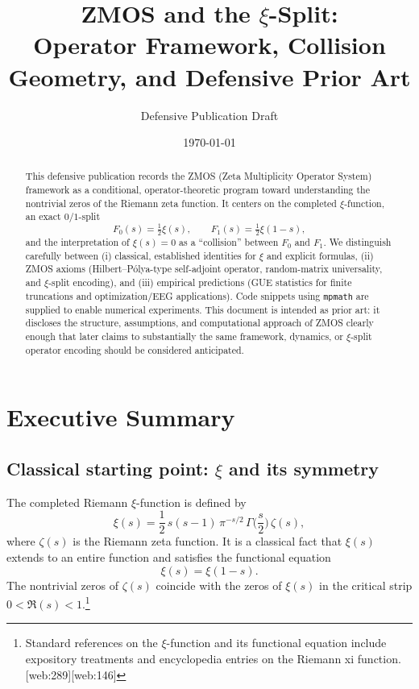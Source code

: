 \documentclass[11pt]{article}
\title{ZMOS and the $\xi$-Split:\\
Operator Framework, Collision Geometry, and Defensive Prior Art}
\author{Defensive Publication Draft}
\date{\today}
\begin{document}
\maketitle

\begin{abstract}
This defensive publication records the ZMOS (Zeta Multiplicity Operator System) framework as a conditional, operator-theoretic program toward understanding the nontrivial zeros of the Riemann zeta function.  It centers on the completed $\xi$-function, an exact $0/1$-split
\[
F_0(s)=\tfrac12\xi(s),\qquad F_1(s)=\tfrac12\xi(1-s),
\]
and the interpretation of $\xi(s)=0$ as a ``collision'' between $F_0$ and $F_1$.  We distinguish carefully between (i) classical, established identities for $\xi$ and explicit formulas, (ii) ZMOS axioms (Hilbert--P\'olya-type self-adjoint operator, random-matrix universality, and $\xi$-split encoding), and (iii) empirical predictions (GUE statistics for finite truncations and optimization/EEG applications).  Code snippets using \texttt{mpmath} are supplied to enable numerical experiments.  This document is intended as prior art: it discloses the structure, assumptions, and computational approach of ZMOS clearly enough that later claims to substantially the same framework, dynamics, or $\xi$-split operator encoding should be considered anticipated.
\end{abstract}

\tableofcontents
\newpage
\section{Executive Summary}

\subsection{Classical starting point: $\xi$ and its symmetry}

The completed Riemann $\xi$-function is defined by
\begin{equation}
  \xi(s) = \frac12\, s(s-1)\,\pi^{-s/2}\,\Gamma\!\Big(\frac{s}{2}\Big)\,\zeta(s),
\end{equation}
where $\zeta(s)$ is the Riemann zeta function.  It is a classical fact that $\xi(s)$ extends to an entire function and satisfies the functional equation
\begin{equation}
  \xi(s) = \xi(1-s).
\end{equation}
The nontrivial zeros of $\zeta(s)$ coincide with the zeros of $\xi(s)$ in the critical strip $0 < \Re(s) < 1$.\footnote{Standard references on the $\xi$-function and its functional equation include expository treatments and encyclopedia entries on the Riemann xi function. [web:289][web:146]}
\end{document}
